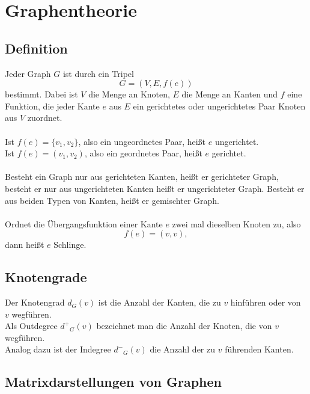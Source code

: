 
\section{Graphentheorie}
\label{sec:graphentheorie}

\subsection{Definition}
\label{sub:definition_graphentheorie}

Jeder Graph $G$ ist durch ein Tripel 
\begin{equation}
	G = (V,E,f(e))
\end{equation}
bestimmt. Dabei ist $V$ die Menge an Knoten, $E$ die Menge an Kanten und $f$ eine
Funktion, die jeder Kante $e$ aus $E$ ein gerichtetes oder ungerichtetes Paar Knoten 
aus $V$ zuordnet.\\\\
Ist $f(e) = \{v_1,v_2\}$, also ein ungeordnetes Paar, heißt $e$ ungerichtet.\\
Ist $f(e) = (v_1,v_2)$, also ein geordnetes Paar, heißt $e$ gerichtet. 
\\\\
Besteht ein Graph nur aus gerichteten Kanten, heißt er gerichteter Graph, besteht er nur
aus ungerichteten Kanten heißt er ungerichteter Graph. Besteht er aus beiden Typen von
Kanten, heißt er gemischter Graph.
\\\\
Ordnet die Übergangsfunktion einer Kante $e$ zwei mal dieselben Knoten zu, also
\begin{equation}
	f(e) = (v,v),
\end{equation}
dann heißt $e$ Schlinge.

\subsection{Knotengrade}
\label{sub:knotengrade}

Der Knotengrad $d_G(v)$ ist die Anzahl der Kanten, die zu $v$ hinführen oder von $v$
wegführen.\\
Als Outdegree ${d^+}_G(v)$ bezeichnet man die Anzahl der Knoten, die von $v$ wegführen.\\
Analog dazu ist der Indegree ${d^-}_G(v)$ die Anzahl der zu $v$ führenden Kanten.

\subsection{Matrixdarstellungen von Graphen}
\label{sub:matrixdarstellungen_von_graphen}

